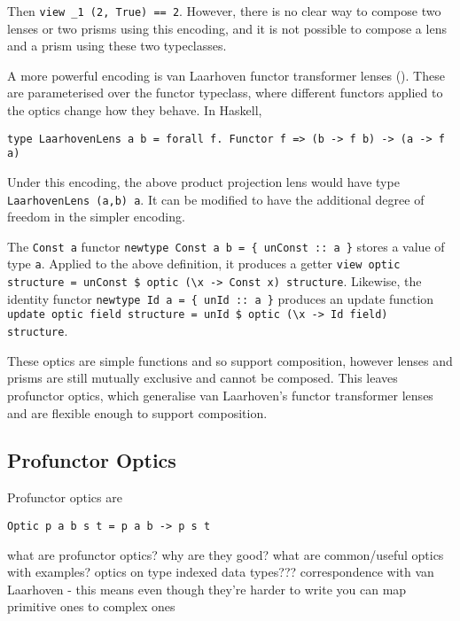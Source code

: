 \documentclass[]{report}
\begin{document}
Then \texttt{view \_1 (2, True) == 2}. However, there is no clear way to compose two lenses or two prisms using this encoding, and it is not possible to compose a lens and a prism using these two typeclasses.

A more powerful encoding is van Laarhoven functor transformer lenses (\cite{laarhoven2011lens}). These are parameterised over the functor typeclass, where different functors applied to the optics change how they behave. In Haskell,

\begin{verbatim}
type LaarhovenLens a b = forall f. Functor f => (b -> f b) -> (a -> f a)
\end{verbatim}

Under this encoding, the above product projection lens would have type \texttt{LaarhovenLens (a,b) a}. It can be modified to have the additional degree of freedom in the simpler encoding.

The \texttt{Const a} functor \texttt{newtype Const a b = \{ unConst :: a \}} stores a value of type \texttt{a}. Applied to the above definition, it produces a getter \texttt{view optic structure = unConst \$ optic (\textbackslash{}x -> Const x) structure}. Likewise, the identity functor \texttt{newtype Id a = \{ unId :: a \}} produces an update function \texttt{update optic field structure = unId \$ optic (\textbackslash{}x -> Id field) structure}.

These optics are simple functions and so support composition, however lenses and prisms are still mutually exclusive and cannot be composed. This leaves profunctor optics, which generalise van Laarhoven's functor transformer lenses and are flexible enough to support composition.

\subsection{Profunctor Optics}

Profunctor optics are

\begin{verbatim}
Optic p a b s t = p a b -> p s t
\end{verbatim}

what are profunctor optics?
why are they good?
what are common/useful optics with examples?
optics on type indexed data types???
correspondence with van Laarhoven \cite{boisseau2018yoneda} - this means even though they're harder to write you can map primitive ones to complex ones
\end{document}
